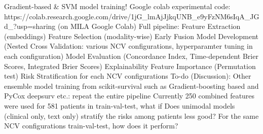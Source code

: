 \documentclass{article}%
\begin{document}
\newline%
%
Gradient{-}based \& SVM model training! %
\newline%
\newline%
%
Google colab experimental code: https://colab.research.google.com/drive/1jG\_lmAjJjkqUNB\_e9yFzNM6sIqA\_JGd\_?usp=sharing (on MILA Google Colab) %
\newline%
\newline%
%
Full pipeline: %
\newline%
\newline%
%
Feature Extraction (embeddings)%
\newline%
\newline%
%
Feature Selection (modality{-}wise) %
\newline%
\newline%
%
Early Fusion %
\newline%
\newline%
%
Model Development (Nested Cross Validation: various NCV configurations, hyperparamter tuning in each configuration) %
\newline%
\newline%
%
Model Evaluation (Concordance Index, Time{-}dependent Brier Scores, Integrated Brier Scores) %
\newline%
\newline%
%
Explainability Feature Importance (Permutation test) %
\newline%
\newline%
%
Risk Stratification for each NCV configurations %
\newline%
\newline%
%
%
\newline%
\newline%
%
To{-}do (Discussion): %
\newline%
\newline%
%
Other ensemble model training from scikit{-}survival such as Gradient{-}boosting based and PyCox deepsurv etc.: repeat the entire pipeline%
\newline%
\newline%
%
Currently 250 combined features were used for 581 patients in train{-}val{-}test, what if %
\newline%
\newline%
%
Does unimodal models (clinical only, text only) stratify the risks among patients less good? %
\newline%
\newline%
%
For the same NCV configurations train{-}val{-}test, how does it perform? %
\end{document}
